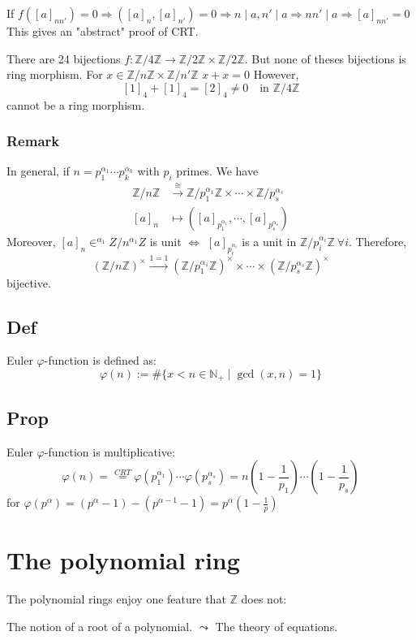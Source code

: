 \documentclass{book}
\newcommand{\zmod}[1]{\mathbb Z/#1\mathbb Z}
\begin{document}
If $f([a]_{nn'})=0\Rightarrow ([a]_n,[a]_{n'})=0\Rightarrow n\mid a,n'\mid a\Rightarrow nn'\mid a\Rightarrow [a]_{nn'}=0$
This gives an "abstract" proof of CRT.

There are 24 bijections $f:\zmod 4\rightarrow\zmod 2\times \zmod 2$. But none of theses bijections is ring morphism. For $x\in \mathbb Z/n\mathbb Z\times\mathbb Z/n'\mathbb Z$ $x+x=0$ However,$$[1]_4+[1]_4=[2]_4\neq 0\quad \text{in } \mathbb Z/4\mathbb Z$$cannot be a ring morphism.
\subsection*{Remark}
In general, if $n=p_1^{\alpha_1}\cdots p_k^{\alpha_k}$ with $p_i$ primes.
We have $$
\begin{aligned}
	\mathbb Z/n\mathbb Z&\stackrel{\cong}{\rightarrow}\mathbb Z/p_1^{\alpha_1}\mathbb Z\times\cdots\times\mathbb Z/p_s^{\alpha_s}\\
	[a]_n&\mapsto([a]_{p_1^{\alpha_1}},\cdots,[a]_{p_s^{\alpha_s}})
\end{aligned}
$$
Moreover, $[a]_n\in ^{\alpha_1}Z/n^{\alpha_1}Z$ is unit $\Leftrightarrow$ $[a]_{p_i^{\alpha_i}}$ is a unit in $\mathbb Z/p_i^{\alpha_i}\mathbb Z\ \forall i$. Therefore,
$$(\zmod n)^\times\stackrel{1=1}{\rightarrow}(\zmod{p_1^{\alpha_1}})^\times\times\cdots\times(\zmod{p_s^{\alpha_s}})^\times$$bijective.
\section{Def}
Euler $\varphi$-function is defined as:$$\varphi(n):=\#\{x<n\in \mathbb N_+\mid \gcd(x,n)=1\}$$
\section{Prop}
Euler $\varphi$-function is multiplicative:$$\varphi(n)=\stackrel{CRT}{=}\varphi(p_1^{\alpha_1})\cdots\varphi(p_s^{\alpha_s})=n(1-\frac{1}{p_1})\cdots(1-\frac{1}{p_s})$$
for $\varphi(p^\alpha)=(p^\alpha-1)-(p^{\alpha-1}-1)=p^\alpha(1-\frac{1}{p})$
\chapter{The polynomial ring}
The polynomial rings enjoy one feature that $\mathbb Z$ does not:

The notion of a root of a polynomial. $\leadsto $ The theory of equations.
\end{document}
